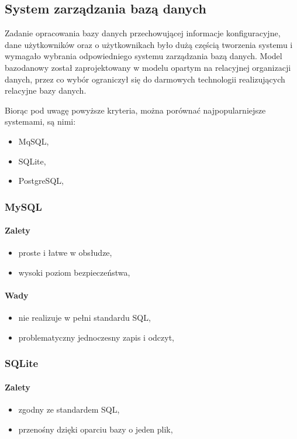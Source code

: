 \documentclass[a4paper,12pt,twoside]{article}
\begin{document}
\subsection{System zarządzania bazą danych}
Zadanie opracowania bazy danych przechowującej informacje konfiguracyjne, dane użytkowników oraz o użytkownikach było dużą częścią tworzenia systemu i
wymagało wybrania odpowiedniego systemu zarządzania bazą danych.
Model bazodanowy został zaprojektowany w modelu opartym na relacyjnej organizacji danych, przez co wybór ograniczył się do
darmowych technologii realizujących relacyjne bazy danych.

\newpage
Biorąc pod uwagę powyższe kryteria, można porównać najpopularniejsze systemami, są nimi\cite{porownanieBaz}:
\begin{itemize}
\item MqSQL,
\item SQLite,
\item PostgreSQL,
\end{itemize}

\subsubsection{MySQL}
\paragraph{Zalety}
\begin{itemize}
\item{proste i łatwe w obsłudze},
\item{wysoki poziom bezpieczeństwa},
\end{itemize}
\paragraph{Wady}
\begin{itemize}
\item{nie realizuje w pełni standardu SQL},
\item{problematyczny jednoczesny zapis i odczyt},
\end{itemize}
\subsubsection{SQLite}
\paragraph{Zalety}
\begin{itemize}
\item{zgodny ze standardem SQL},
\item{przenośny dzięki oparciu bazy o jeden plik},
\end{itemize}
\end{document}
